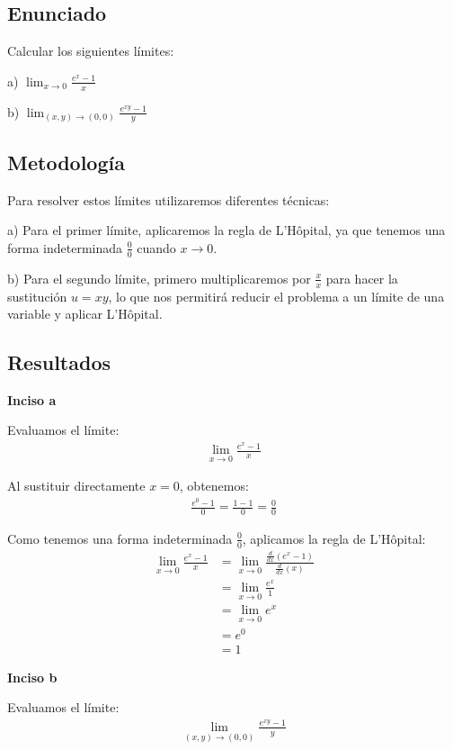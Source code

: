 \documentclass{article}
\begin{document}
\subsection{Enunciado}
Calcular los siguientes límites:

a) $\lim_{x \to 0} \frac{e^x - 1}{x}$

b) $\lim_{(x,y) \to (0,0)} \frac{e^{xy} - 1}{y}$

\subsection{Metodología}

Para resolver estos límites utilizaremos diferentes técnicas:

a) Para el primer límite, aplicaremos la regla de L'Hôpital, ya que tenemos una forma indeterminada $\frac{0}{0}$ cuando $x \to 0$.

b) Para el segundo límite, primero multiplicaremos por $\frac{x}{x}$ para hacer la sustitución $u = xy$, lo que nos permitirá reducir el problema a un límite de una variable y aplicar L'Hôpital.

\subsection{Resultados}
\setcounter{equation}{0}

\textbf{Inciso a}

Evaluamos el límite:
\begin{align}
\lim_{x \to 0} \frac{e^x - 1}{x}
\end{align}

Al sustituir directamente $x = 0$, obtenemos:
\begin{align}
\frac{e^0 - 1}{0} = \frac{1 - 1}{0} = \frac{0}{0}
\end{align}

Como tenemos una forma indeterminada $\frac{0}{0}$, aplicamos la regla de L'Hôpital:
\begin{align}
\lim_{x \to 0} \frac{e^x - 1}{x} &= \lim_{x \to 0} \frac{\frac{d}{dx}(e^x - 1)}{\frac{d}{dx}(x)} \\
&= \lim_{x \to 0} \frac{e^x}{1} \\
&= \lim_{x \to 0} e^x \\
&= e^0 \\
&= 1
\end{align}

\textbf{Inciso b}

Evaluamos el límite:
\begin{align}
\lim_{(x,y) \to (0,0)} \frac{e^{xy} - 1}{y}
\end{align}
\end{document}
